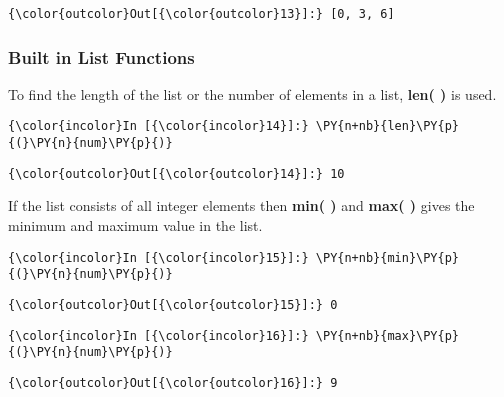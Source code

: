             \begin{Verbatim}[commandchars=\\\{\}]
{\color{outcolor}Out[{\color{outcolor}13}]:} [0, 3, 6]
\end{Verbatim}
        
    \subsubsection{Built in List Functions}\label{built-in-list-functions}

    To find the length of the list or the number of elements in a list,
\textbf{len( )} is used.

    \begin{Verbatim}[commandchars=\\\{\}]
{\color{incolor}In [{\color{incolor}14}]:} \PY{n+nb}{len}\PY{p}{(}\PY{n}{num}\PY{p}{)}
\end{Verbatim}

            \begin{Verbatim}[commandchars=\\\{\}]
{\color{outcolor}Out[{\color{outcolor}14}]:} 10
\end{Verbatim}
        
    If the list consists of all integer elements then \textbf{min( )} and
\textbf{max( )} gives the minimum and maximum value in the list.

    \begin{Verbatim}[commandchars=\\\{\}]
{\color{incolor}In [{\color{incolor}15}]:} \PY{n+nb}{min}\PY{p}{(}\PY{n}{num}\PY{p}{)}
\end{Verbatim}

            \begin{Verbatim}[commandchars=\\\{\}]
{\color{outcolor}Out[{\color{outcolor}15}]:} 0
\end{Verbatim}
        
    \begin{Verbatim}[commandchars=\\\{\}]
{\color{incolor}In [{\color{incolor}16}]:} \PY{n+nb}{max}\PY{p}{(}\PY{n}{num}\PY{p}{)}
\end{Verbatim}

            \begin{Verbatim}[commandchars=\\\{\}]
{\color{outcolor}Out[{\color{outcolor}16}]:} 9
\end{Verbatim}
        
